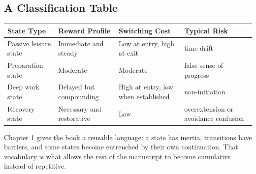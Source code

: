 \subsection{A Classification Table}

\begin{center}
\begin{tabular}{@{}p{} p{} p{} p{}@{}}
\toprule
\textbf{State Type} & \textbf{Reward Profile} & \textbf{Switching Cost} & \textbf{Typical Risk} \\
\midrule
Passive leisure state & Immediate and steady & Low at entry, high at exit & time drift \\
Preparation state & Moderate & Moderate & false sense of progress \\
Deep work state & Delayed but compounding & High at entry, low when established & non-initiation \\
Recovery state & Necessary and restorative & Low & overextension or avoidance confusion \\
\bottomrule
\end{tabular}
\end{center}

\begin{summarybox}
Chapter 1 gives the book a reusable language: a state has inertia, transitions
have barriers, and some states become entrenched by their own continuation.
That vocabulary is what allows the rest of the manuscript to become cumulative
instead of repetitive.
\end{summarybox}

